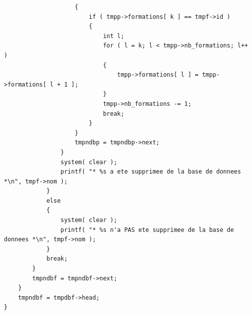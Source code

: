 \documentclass[11pt]{article}
\begin{document}
\begin{lstlisting}
                    {
                        if ( tmpp->formations[ k ] == tmpf->id )
                        {
                            int l;
                            for ( l = k; l < tmpp->nb_formations; l++ )
                            {
                                tmpp->formations[ l ] = tmpp->formations[ l + 1 ];
                            }
                            tmpp->nb_formations -= 1;
                            break;
                        }
                    }
                    tmpndbp = tmpndbp->next;
                }
                system( clear );
                printf( "* %s a ete supprimee de la base de donnees *\n", tmpf->nom );
            }
            else
            {
                system( clear );
                printf( "* %s n'a PAS ete supprimee de la base de donnees *\n", tmpf->nom );
            }
            break;
        }
        tmpndbf = tmpndbf->next;
    }
    tmpndbf = tmpdbf->head;
}


\end{lstlisting}
\end{document}

